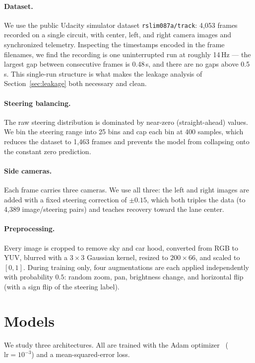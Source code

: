 \documentclass[11pt]{article}
\begin{document}
\paragraph{Dataset.}
We use the public Udacity simulator dataset \texttt{rslim087a/track}: 4{,}053 frames
recorded on a single circuit, with center, left, and right camera images and
synchronized telemetry. Inspecting the timestamps encoded in the frame filenames, we
find the recording is one uninterrupted run at roughly 14\,Hz --- the largest gap
between consecutive frames is 0.48\,s, and there are no gaps above 0.5\,s. This
single-run structure is what makes the leakage analysis of Section~\ref{sec:leakage}
both necessary and clean.

\paragraph{Steering balancing.}
The raw steering distribution is dominated by near-zero (straight-ahead) values. We
bin the steering range into 25 bins and cap each bin at 400 samples, which reduces
the dataset to 1{,}463 frames and prevents the model from collapsing onto the
constant zero prediction.

\paragraph{Side cameras.}
Each frame carries three cameras. We use all three: the left and right images are
added with a fixed steering correction of $\pm 0.15$, which both triples the data
(to 4{,}389 image/steering pairs) and teaches recovery toward the lane center.

\paragraph{Preprocessing.}
Every image is cropped to remove sky and car hood, converted from RGB to YUV,
blurred with a $3\times3$ Gaussian kernel, resized to $200\times66$, and scaled to
$[0,1]$. During training only, four augmentations are each applied independently
with probability $0.5$: random zoom, pan, brightness change, and horizontal flip
(with a sign flip of the steering label).

\section{Models}
\label{sec:models}

We study three architectures. All are trained with the Adam
optimizer~\mbox{\citep{kingma2015adam}} ($\text{lr}=10^{-3}$) and a mean-squared-error
loss.
\end{document}
